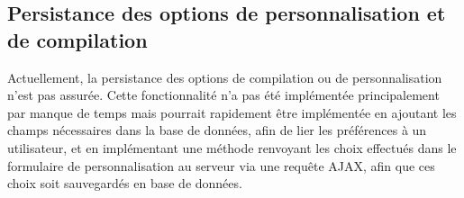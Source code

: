 \subsection{Persistance des options de personnalisation et de compilation}

Actuellement, la persistance des options de compilation ou de personnalisation n'est pas assurée. Cette fonctionnalité n'a pas été implémentée principalement par manque de temps mais pourrait rapidement être implémentée en ajoutant les champs nécessaires dans la base de données, afin de lier les préférences à un utilisateur, et en implémentant une méthode renvoyant les choix effectués dans le formulaire de personnalisation au serveur via une requête AJAX, afin que ces choix soit sauvegardés en base de données.
